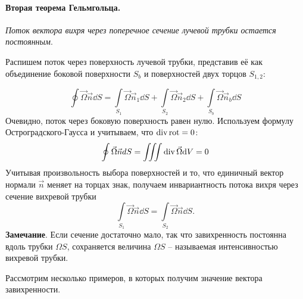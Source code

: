 \paragraph{Вторая теорема Гельмгольца. }\textit{Поток вектора вихря через поперечное сечение лучевой трубки остается постоянным}. 

Распишем поток через поверхность лучевой трубки, представив её как объединение боковой поверхности  $S_b$ и поверхностей двух торцов $S_{1,2}$:

\begin{equation}
 	\oint \vec \Omega \vec{n} \dd S=\int\limits_{S_1} \vec \Omega \vec{n}_1 \dd S  + \int\limits_{S_2} \vec \Omega \vec{n}_2 \dd S + \int\limits_{S_b} \vec \Omega \vec{n}_b \dd S
 \end{equation} 
Очевидно, поток через боковую поверхность равен нулю. Используем формулу Остроградского-Гаусса и учитываем, что $\operatorname{div} \operatorname{rot} = 0$:
\begin{equation}
	\oint \vec \Omega \vec{n} dS=\iiint \operatorname{div}\vec \Omega \dd V=0
\end{equation}
Учитывая произвольность выбора поверхностей и то, что единичный
вектор нормали $\vec{n}$ меняет на торцах знак,
получаем инвариантность потока вихря через сечение вихревой трубки
\begin{equation}
	\int\limits_{S_1} \vec \Omega \vec{n} \dd S=\int\limits_{S_2} \vec \Omega \vec{n} \dd S.
\end{equation}
\textbf{Замечание}.
Если сечение достаточно мало, так что завихренность постоянна вдоль
трубки $\Omega S$, сохраняется величина $\Omega S$ -- называемая интенсивностью вихревой трубки.

Рассмотрим несколько примеров, в которых получим значение вектора завихренности.

